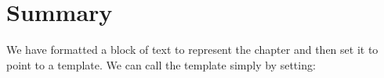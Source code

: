 \newcommand{\blockchapter}[2][]{%
  \makeatletter
\parindent0pt\fboxsep1.5pt\fboxrule0pt

\savebox\chapterblock{%
       \colorbox{black}{%
       \fbox{\color{white}%
          \sffamily\bfseries\large
          \hspace*{1.5cm}\chaptername\space\thechapter\space%
       }%
   }%
}

\setlength\templength{\the\wd\chapterblock}
\setlength\tempdepth{\the\dp\chapterblock}


\usebox\chapterblock%
\lower\dimexpr(\tempdepth-.2pt-1pt)\hbox{%
\vrule width\dimexpr(\columnwidth-\templength) height0.2pt depth1pt}\par
\vspace*{6.5pt}

\addtolength{\templength}{-1.5cm}
\hspace*{\templength}{\Huge\bfseries\arial #2}\par
\vspace*{36pt}
\texttt{[image: ./images/book]}\raisebox{10pt}{\rule{\textwidth-\templength}{0.4pt}}\vskip-3pt
\hspace*{\templength}{\bfseries \LARGE\sffamily After reading this chapter you will be able to:}
\bigskip


\hspace*{\dimexpr(\templength-20pt)\relax}\begin{minipage}{\textwidth-\templength}
\begin{itemize}\arial
\item Understand how boxes can be used to measure dimensions of typeset material.
\item Incorporate calculations into templates.
\item Provide an API for your template.
\item Adjust existing designs.
\end{itemize}
\vspace*{24pt}
\end{minipage}
\chapterafterheading@cx
\arial 
\makeatother
}

\section{Summary}

We have formatted a block of text to represent the chapter and then set it to point to a template. We can call the template simply by setting:

